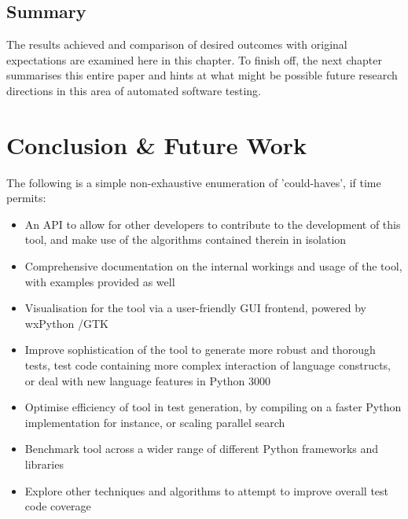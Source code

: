 \documentclass{icldt}
\numberwithin{equation}{section}       %
\begin{document}
\section{Summary}
The results achieved and comparison of desired outcomes with original expectations are examined here in this chapter. To finish off, the next chapter summarises this entire paper and hints at what might be possible future research directions in this area of automated software testing.
\chapter{Conclusion \& Future Work}
\label{ch:conclusion}
The following is a simple non-exhaustive enumeration of 'could-haves', if time permits:
\begin{itemize}
	\item An API to allow for other developers to contribute to the development of this tool, and make use of the algorithms contained therein in isolation
	\item Comprehensive documentation on the internal workings and usage of the tool, with examples provided as well
	\item Visualisation for the tool via a user-friendly GUI frontend, powered by wxPython /GTK
	\item Improve sophistication of the tool to generate more robust and thorough tests, test code containing more complex interaction of language constructs, or deal with new language features in Python 3000
	\item Optimise efficiency of tool in test generation, by compiling on a faster Python implementation for instance, or scaling parallel search
	\item Benchmark tool across a wider range of different Python frameworks and libraries
	\item Explore other techniques and algorithms to attempt to improve overall test code coverage
\end{itemize}

\nocite{*}
\end{document}
